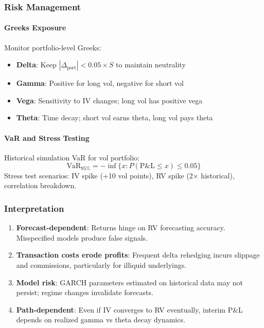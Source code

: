 \subsubsection{Risk Management}

\paragraph{Greeks Exposure}

Monitor portfolio-level Greeks:
\begin{itemize}
  \item \textbf{Delta}: Keep $|\Delta_{\text{port}}| < 0.05 \times S$ to maintain neutrality
  \item \textbf{Gamma}: Positive for long vol, negative for short vol
  \item \textbf{Vega}: Sensitivity to IV changes; long vol has positive vega
  \item \textbf{Theta}: Time decay; short vol earns theta, long vol pays theta
\end{itemize}

\paragraph{VaR and Stress Testing}

Historical simulation VaR for vol portfolio:
\[
\text{VaR}_{95\%} = -\inf \{ x : P(\text{P\&L} \leq x) \leq 0.05 \}
\]
Stress test scenarios: IV spike (+10 vol points), RV spike (2$\times$ historical), correlation breakdown.

\subsubsection{Interpretation}

\begin{enumerate}
  \item \textbf{Forecast-dependent}: Returns hinge on RV forecasting accuracy. Misspecified models produce false signals.

  \item \textbf{Transaction costs erode profits}: Frequent delta rehedging incurs slippage and commissions, particularly for illiquid underlyings.

  \item \textbf{Model risk}: GARCH parameters estimated on historical data may not persist; regime changes invalidate forecasts.

  \item \textbf{Path-dependent}: Even if IV converges to RV eventually, interim P\&L depends on realized gamma vs theta decay dynamics.
\end{enumerate}


